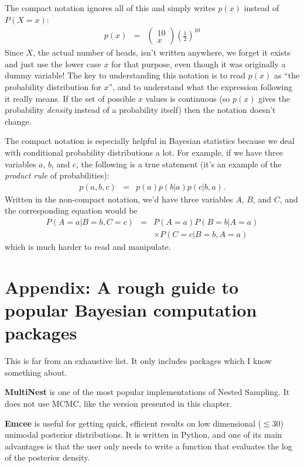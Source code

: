 The compact notation ignores all of this and simply writes $p(x)$ instead of
$P(X=x)$:
\begin{eqnarray}
p(x) &=& \left(\begin{array}{cc}10\\ x\end{array}\right)
\left(\frac{1}{2}\right)^{10}
\end{eqnarray}
Since $X$, the actual number of heads, isn't written anywhere, we forget it
exists and just use the lower case $x$ for that purpose, even though it was
originally a dummy variable!
The key to understanding this notation is to read $p(x)$ as ``the probability
distribution for $x$'', and to understand what the expression following it
really means. If the set of possible $x$ values is continuous (so $p(x)$ gives
the probability {\it density} instead of a probability itself) then the
notation doesn't change.

The compact notation is especially helpful in Bayesian statistics because
we deal with conditional probability distributions a lot. For example, if we
have three variables $a$, $b$, and $c$, the following is a true statement
(it's an example of the {\it product rule} of probabilities):
\begin{eqnarray}
p(a, b, c) &=& p(a)p(b|a)p(c|b,a).
\end{eqnarray}
Written in the non-compact notation, we'd have three variables $A$, $B$, and
$C$, and the corresponding equation would be
\begin{eqnarray}
P(A=a | B=b, C=c) &=&
 P(A=a)P(B=b|A=a)\\
& & \times P(C=c|B=b,A=a)
\end{eqnarray}
which is much harder to read and manipulate.

\section{Appendix: A rough guide to popular Bayesian computation packages}
This is far from an exhaustive list. It only includes packages which I know
something about.

{\bf MultiNest} \citep{multinest} is one of the most popular implementations of
Nested Sampling. It does not use MCMC, like the version presented in this
chapter.

{\bf Emcee} \citep{emcee} is useful for getting quick, efficient results on low
dimensional ($\lesssim 30$) unimodal posterior distributions.
It is written in Python, and one of its main advantages is that the user only
needs to write a function that evaluates the log of the posterior density.

